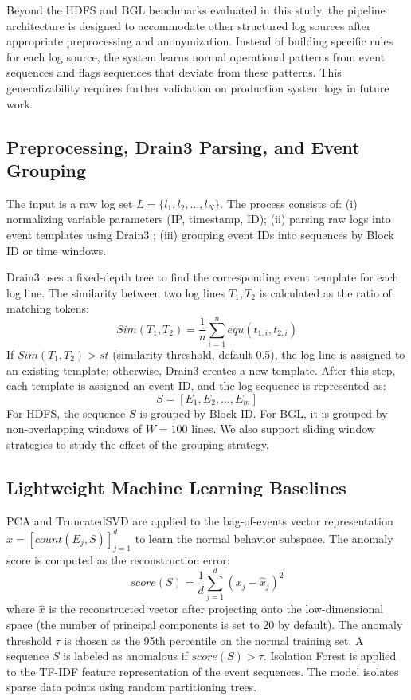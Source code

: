 \documentclass[conference]{IEEEtran}
\begin{document}
Beyond the HDFS and BGL benchmarks evaluated in this study, the pipeline architecture is designed to accommodate other structured log sources after appropriate preprocessing and anonymization. Instead of building specific rules for each log source, the system learns normal operational patterns from event sequences and flags sequences that deviate from these patterns. This generalizability requires further validation on production system logs in future work.

\subsection{Preprocessing, Drain3 Parsing, and Event Grouping}
The input is a raw log set $L=\{l_1,l_2,\ldots,l_N\}$. The process consists of: (i) normalizing variable parameters (IP, timestamp, ID); (ii) parsing raw logs into event templates using Drain3 \cite{b3}; (iii) grouping event IDs into sequences by Block ID or time windows.

Drain3 uses a fixed-depth tree to find the corresponding event template for each log line. The similarity between two log lines $T_1, T_2$ is calculated as the ratio of matching tokens:
\begin{equation}
Sim(T_1, T_2) = \frac{1}{n} \sum_{i=1}^{n} equ(t_{1,i}, t_{2,i})
\label{eq_sim}
\end{equation}
If $Sim(T_1, T_2) > st$ (similarity threshold, default 0.5), the log line is assigned to an existing template; otherwise, Drain3 creates a new template. After this step, each template is assigned an event ID, and the log sequence is represented as:
\begin{equation}
S = [E_1, E_2, ..., E_m]
\end{equation}
For HDFS, the sequence $S$ is grouped by Block ID. For BGL, it is grouped by non-overlapping windows of $W{=}100$ lines. We also support sliding window strategies to study the effect of the grouping strategy.

\subsection{Lightweight Machine Learning Baselines}
PCA and TruncatedSVD are applied to the bag-of-events vector representation $x = [count(E_j, S)]_{j=1}^d$ to learn the normal behavior subspace. The anomaly score is computed as the reconstruction error:
\begin{equation}
score(S)=\frac{1}{d}\sum_{j=1}^{d}(x_j-\hat{x}_j)^2
\label{eq_reconstruction}
\end{equation}
where $\hat{x}$ is the reconstructed vector after projecting onto the low-dimensional space (the number of principal components is set to 20 by default). The anomaly threshold $\tau$ is chosen as the 95th percentile on the normal training set. A sequence $S$ is labeled as anomalous if $score(S) > \tau$.
Isolation Forest is applied to the TF-IDF feature representation of the event sequences. The model isolates sparse data points using random partitioning trees.
\end{document}
